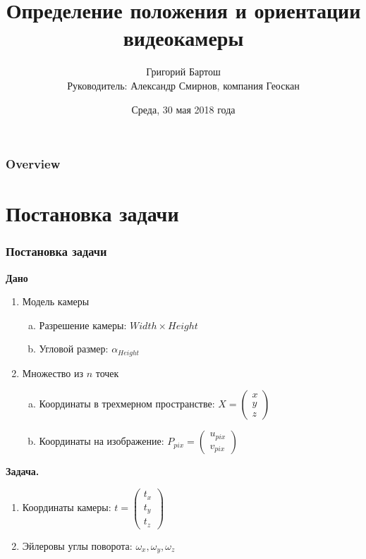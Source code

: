 \documentclass{beamer}
\title[Позиционирование видеокамеры]{Определение положения и ориентации видеокамеры}
\author[Григорий Бартош]{
	Григорий Бартош\\
	\scriptsize Руководитель: Александр Смирнов, компания Геоскан
}
\institute[СПб АУ]{Санкт-Петербургский Академический Университет}
\date[30.05.2018]{Среда, 30 мая 2018 года}
\newenvironment{InnerMyList}[1][0pt]{
	\vspace*{-0.5em}
	\begin{enumerate}[a)]
		\setlength{\parskip}{#1}
		\setlength{\itemsep}{0pt}
	}{
\end{enumerate}
}
\begin{document}
\begin{frame}
\titlepage
\end{frame}

\begin{frame}
\frametitle{Overview}
\tableofcontents
\end{frame}


\section{Постановка задачи}

\begin{frame}
\frametitle{Постановка задачи}
\textbf{Дано}
\begin{enumerate}
	\item 
	Модель камеры\\
	\begin{InnerMyList}
		\item
		Разрешение камеры: $Width \times Height$
		
		\item
		Угловой размер: $\alpha_{Height}$
	\end{InnerMyList}
	
	\item
	Множество из $n$ точек\\
	\begin{InnerMyList}
		\item
		Координаты в трехмерном пространстве:
			$X = \begin{pmatrix} 
			x \\
			y \\
			z
			\end{pmatrix}$
		
		\item
		Координаты на изображение: 
			$P_{pix} = \begin{pmatrix} 
			u_{pix} \\
			v_{pix}
			\end{pmatrix}$
	\end{InnerMyList}
\end{enumerate}

\textbf{Задача.}\\
\begin{enumerate}
	\item 
	Координаты камеры:
		$t = \begin{pmatrix} 
		t_x \\
		t_y \\
		t_z
		\end{pmatrix}$
	
	\item
	Эйлеровы углы поворота: $\omega_x, \omega_y, \omega_z$
\end{enumerate}
\end{frame}
\end{document}
